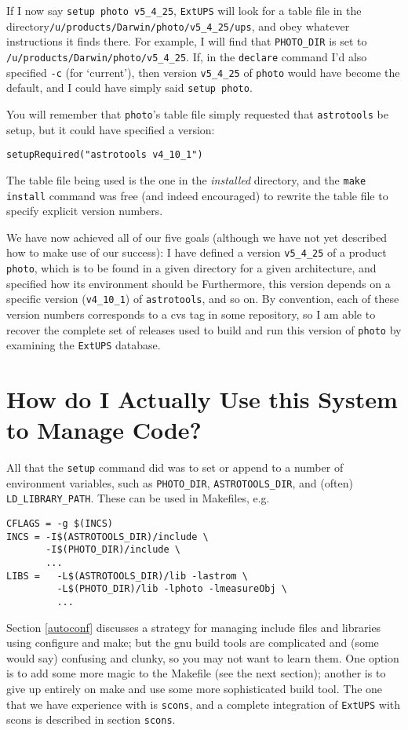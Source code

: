 \documentclass{article}
\newcommand{\code}[1]{\texttt{#1}}
\newcommand{\eups}{\code{ExtUPS}}
\begin{document}
If I now say \code{setup photo v5\_4\_25}, \eups{} will look for
a table file in the directory\hfil\break \code{/u/products/Darwin/photo/v5\_4\_25/ups},
and obey whatever instructions it finds there.  For example,
I will find that
\code{PHOTO\_DIR} is set to \code{/u/products/Darwin/photo/v5\_4\_25}. If,
in the \code{declare} command I'd also specified \code{-c} (for
`current'), then version \code{v5\_4\_25} of \code{photo} would
have become the default, and I could have simply said \code{setup photo}.

You will remember that \code{photo}'s table file simply requested
that \code{astrotools} be setup, but it could have specified a version:
\begin{verbatim}
setupRequired("astrotools v4_10_1")
\end{verbatim}
The table file being used is the one in the \emph{installed} directory,
and the \code{make install} command was free (and indeed encouraged) to
rewrite the table file to specify explicit version numbers.

We have now achieved all of our five goals (although we have not
yet described how to make use of our success): I have defined
a version \code{v5\_4\_25} of a product \code{photo}, which is
to be found in a given directory for a given architecture,
and specified how its environment should be Furthermore,
this version depends on a specific version (\code{v4\_10\_1}) of
\code{astrotools}, and so on. By convention, each of these version
numbers corresponds to a cvs tag in some repository, so I am
able to recover the complete set of releases used to build and
run this version of \code{photo} by examining the \eups{} database.

\section{How do I Actually Use this System to Manage Code?}

All that the \code{setup} command did was to set or append to a number of environment variables,
such as \code{PHOTO\_DIR}, \code{ASTROTOOLS\_DIR}, and (often) \code{LD\_LIBRARY\_PATH}.
These can be used in Makefiles, e.g.
\begin{verbatim}
CFLAGS = -g $(INCS)
INCS = -I$(ASTROTOOLS_DIR)/include \
       -I$(PHOTO_DIR)/include \
       ...
LIBS =   -L$(ASTROTOOLS_DIR)/lib -lastrom \
         -L$(PHOTO_DIR)/lib -lphoto -lmeasureObj \
         ...
\end{verbatim} %

Section \ref{autoconf} discusses a strategy for managing include files
and libraries using configure and make; but the gnu build tools are
complicated and (some would say) confusing and clunky, so you may
not want to learn them.  One option is to add some more magic
to the Makefile (see the next section);  another is to give up
entirely on make and use some more sophisticated build tool.  The
one that we have experience with is \code{scons}, and a complete
integration of \eups{} with scons is described in section \code{scons}.
\end{document}
